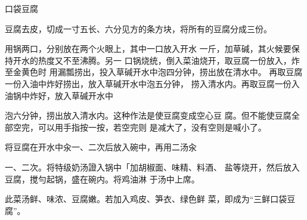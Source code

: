 \begin{recipe}{口袋豆腐}

\ingredients



\cooking

\step 豆腐去皮，切成一寸五长、六分见方的条方块，将所有的豆腐分成三份。

用锅两口，分别放在两个火眼上，其中一口放入开水 一斤，加草碱，其火候要保持开水的热度又不至沸腾。另一 口锅烧统，倒入菜油烧开，取豆腐一份放入，炸至金黄色时 用漏瓢捞出，投入草碱开水中泡四分钟，捞出放在清水中。 再取豆腐一份入油中炸好捞出，放入草碱开水中泡五分钟， 捞入清水内。再取豆腐一份入油锅中炸好，放入草碱开水中

泡六分钟，捞出放入清水内。这种作法是使豆腐变成空心豆 腐。但不能使豆腐全部空完，可以用手指按一按，若空完则 是减大了，没有空则是喊小了。

将豆腐在开水中汆一、二次后放入碗中，再用二汤汆

一、二次。将特级奶汤證入锅中「加胡椒面、味精、料酒、 盐等烧开，然后放入豆腐，搅勻起锅，盛在碗内。将鸡油淋 于汤中上席。

\notes

此菜汤鲜、味浓、豆腐嫩。若加入鸡皮、笋衣、绿色鲜 菜，即成为“三鲜口袋豆腐”。

\end{recipe}


